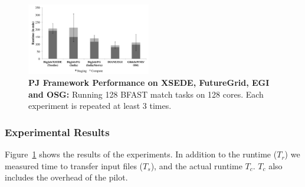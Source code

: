 \documentclass[conference]{IEEEtran}
\begin{document}

\begin{figure}[t]
 \centering
 \includegraphics[width=0.48\textwidth]{../perf/interop/128-bfast-egi-fg-xsede-osg-with-staging.pdf}
 \caption{\textbf{PJ Framework Performance on XSEDE, FutureGrid, EGI and 
  OSG:} Running 128 BFAST match tasks on 128 cores. Each experiment is
  repeated at least 3 times. }
\label{fig:perf_perf-bfast-bj}
\end{figure}


\subsubsection*{Experimental Results}

Figure~\ref{fig:perf_perf-bfast-bj} shows the results of the
experiments. In addition to the runtime ($T_r$) we
measured %
time to transfer input files ($T_s$), and the actual runtime
$T_c$. $T_c$ also includes the overhead of the pilot. 
 


\end{document}
